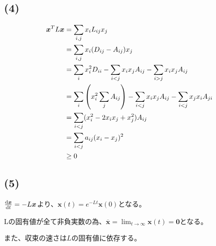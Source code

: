 \documentclass[a4paper, 10pt, dvipdfmx]{jlreq}
\begin{document}
\subsection*{(4)}
\begin{align*}
  \bm{x}^T L \bm{x} & =\sum_{i,j}x_i L_{ij} x_j                                                                \\
                    & =\sum_{i,j}x_i (D_{ij}-A_{ij}) x_j                                                       \\
                    & =\sum_{i}x_i^2 D_{ii}-\sum_{i<j}x_i x_j A_{ij}- \sum_{i>j}x_i x_j A_{ij}                 \\
                    & =\sum_{i}\qty(x_i^2 \sum_{j}{A_{ij}})-\sum_{i<j}x_i x_j A_{ij}- \sum_{i<j}x_j x_i A_{ji} \\
                    & =\sum_{i<j}(x_i^2 -2x_i x_j +x_j^2) A_{ij}                                               \\
                    & =\sum_{i<j}a_{ij}(x_i -x_j)^2                                                            \\
                    & \geq 0
\end{align*}

\subsection*{(5)}

$\dv{\bm{x}}{t}=-L\bm{x}$より、$\bm{x}(t)=e^{-Lt}\bm{x}(0)$となる。

Lの固有値が全て非負実数の為、$\bm{\overline{x}}=\lim_{t \to \infty}\bm{x}(t) = \bm{0}$となる。

また、収束の速さは$L$の固有値に依存する。
\end{document}
